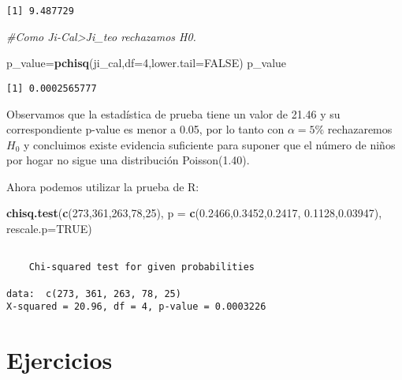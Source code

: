 \documentclass[
  a4paper,
  oneside,
  openany]{book}
\newenvironment{Shaded}{\begin{snugshade}}{\end{snugshade}}
\newcommand{\AttributeTok}[1]{\textcolor[rgb]{0.13,0.29,0.53}{#1}}
\newcommand{\CommentTok}[1]{\textcolor[rgb]{0.56,0.35,0.01}{\textit{#1}}}
\newcommand{\ConstantTok}[1]{\textcolor[rgb]{0.56,0.35,0.01}{#1}}
\newcommand{\DecValTok}[1]{\textcolor[rgb]{0.00,0.00,0.81}{#1}}
\newcommand{\FloatTok}[1]{\textcolor[rgb]{0.00,0.00,0.81}{#1}}
\newcommand{\FunctionTok}[1]{\textcolor[rgb]{0.13,0.29,0.53}{\textbf{#1}}}
\newcommand{\NormalTok}[1]{#1}
\newcommand{\OtherTok}[1]{\textcolor[rgb]{0.56,0.35,0.01}{#1}}
\begin{document}
\begin{verbatim}
[1] 9.487729
\end{verbatim}

\begin{Shaded}
\begin{Highlighting}[]
\CommentTok{\#Como Ji{-}Cal\textgreater{}Ji\_teo rechazamos H0.}

\NormalTok{p\_value}\OtherTok{=}\FunctionTok{pchisq}\NormalTok{(ji\_cal,}\AttributeTok{df=}\DecValTok{4}\NormalTok{,}\AttributeTok{lower.tail=}\ConstantTok{FALSE}\NormalTok{)}
\NormalTok{p\_value}
\end{Highlighting}
\end{Shaded}

\begin{verbatim}
[1] 0.0002565777
\end{verbatim}

Observamos que la estadística de prueba tiene un valor de 21.46 y su correspondiente p-value es menor a 0.05, por lo tanto con \(\alpha=5\%\) rechazaremos \(H_0\) y concluimos existe evidencia suficiente para suponer que el número de niños por hogar no sigue una distribución Poisson(1.40).

Ahora podemos utilizar la prueba de R:

\begin{Shaded}
\begin{Highlighting}[]
\FunctionTok{chisq.test}\NormalTok{(}\FunctionTok{c}\NormalTok{(}\DecValTok{273}\NormalTok{,}\DecValTok{361}\NormalTok{,}\DecValTok{263}\NormalTok{,}\DecValTok{78}\NormalTok{,}\DecValTok{25}\NormalTok{), }\AttributeTok{p =} \FunctionTok{c}\NormalTok{(}\FloatTok{0.2466}\NormalTok{,}\FloatTok{0.3452}\NormalTok{,}\FloatTok{0.2417}\NormalTok{,}
                                       \FloatTok{0.1128}\NormalTok{,}\FloatTok{0.03947}\NormalTok{), }\AttributeTok{rescale.p=}\ConstantTok{TRUE}\NormalTok{)}
\end{Highlighting}
\end{Shaded}

\begin{verbatim}

    Chi-squared test for given probabilities

data:  c(273, 361, 263, 78, 25)
X-squared = 20.96, df = 4, p-value = 0.0003226
\end{verbatim}

\hypertarget{ejercicios-12}{%
\section{Ejercicios}\label{ejercicios-12}}
\end{document}

